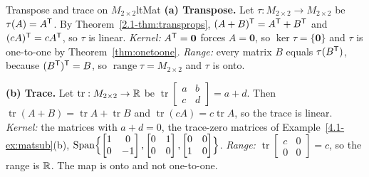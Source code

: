 \documentclass[11pt]{article}
\begin{document}
\begin{exmp}{Transpose and trace on $M_{2\times2}$}{ltMat}
\textbf{(a) Transpose.} Let $\tau:M_{2\times2}\to M_{2\times2}$ be $\tau(A)=A^{\mathsf T}$. By Theorem~\ref{2.1-thm:transprops}, $(A+B)^{\mathsf T}=A^{\mathsf T}+B^{\mathsf T}$ and $(cA)^{\mathsf T}=cA^{\mathsf T}$, so $\tau$ is linear. \emph{Kernel:} $A^{\mathsf T}=\mathbf{0}$ forces $A=\mathbf{0}$, so $\ker\tau=\{\mathbf{0}\}$ and $\tau$ is one-to-one by Theorem~\ref{thm:onetoone}. \emph{Range:} every matrix $B$ equals $\tau(B^{\mathsf T})$, because $(B^{\mathsf T})^{\mathsf T}=B$, so $\operatorname{range}\tau=M_{2\times2}$ and $\tau$ is onto.

\textbf{(b) Trace.} Let $\operatorname{tr}:M_{2\times2}\to\mathbb{R}$ be $\operatorname{tr}\begin{bmatrix}a&b\\c&d\end{bmatrix}=a+d$. Then $\operatorname{tr}(A+B)=\operatorname{tr}A+\operatorname{tr}B$ and $\operatorname{tr}(cA)=c\operatorname{tr}A$, so the trace is linear. \emph{Kernel:} the matrices with $a+d=0$, the trace-zero matrices of Example~\ref{4.1-ex:matsub}(b), $\operatorname{Span}\Bigl\{\begin{bmatrix}1&0\\0&-1\end{bmatrix},\begin{bmatrix}0&1\\0&0\end{bmatrix},\begin{bmatrix}0&0\\1&0\end{bmatrix}\Bigr\}$. \emph{Range:} $\operatorname{tr}\begin{bmatrix}c&0\\0&0\end{bmatrix}=c$, so the range is $\mathbb{R}$. The map is onto and not one-to-one.
\end{exmp}
\end{document}
